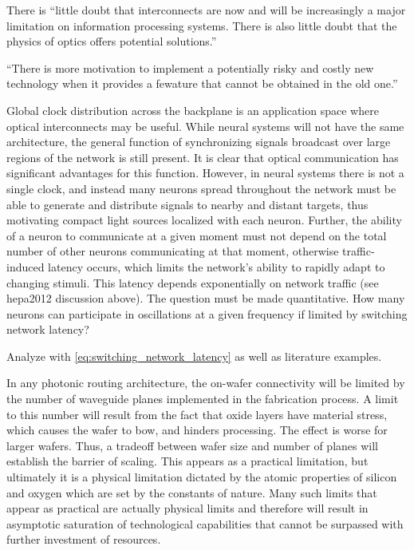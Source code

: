 \vspace{3em}
There is ``little doubt that interconnects are now and will be increasingly a major limitation on information processing systems. There is also little doubt that the physics of optics offers potential solutions.'' \cite{mi2009}

\vspace{3em}
``There is more motivation to implement a potentially risky and costly new technology when it provides a fewature that cannot be obtained in the old one.'' \cite{husz2003}

Global clock distribution across the backplane is an application space where optical interconnects may be useful. While neural systems will not have the same architecture, the general function of synchronizing signals broadcast over large regions of the network is still present. It is clear that optical communication has significant advantages for this function. However, in neural systems there is not a single clock, and instead many neurons spread throughout the network must be able to generate and distribute signals to nearby and distant targets, thus motivating compact light sources localized with each neuron. Further, the ability of a neuron to communicate at a given moment must not depend on the total number of other neurons communicating at that moment, otherwise traffic-induced latency occurs, which limits the network's ability to rapidly adapt to changing stimuli. This latency depends exponentially on network traffic (see hepa2012 discussion above). The question must be made quantitative. How many neurons can participate in oscillations at a given frequency if limited by switching network latency?

Analyze with \ref{eq:switching_network_latency} as well as literature examples. 

\vspace{3em}
\cite{walo2018}

\vspace{3em}
In any photonic routing architecture, the on-wafer connectivity will be limited by the number of waveguide planes implemented in the fabrication process. A limit to this number will result from the fact that oxide layers have material stress, which causes the wafer to bow, and hinders processing. The effect is worse for larger wafers. Thus, a tradeoff between wafer size and number of planes will establish the barrier of scaling. This appears as a practical limitation, but ultimately it is a physical limitation dictated by the atomic properties of silicon and oxygen which are set by the constants of nature. Many such limits that appear as practical are actually physical limits and therefore will result in asymptotic saturation of technological capabilities that cannot be surpassed with further investment of resources.


